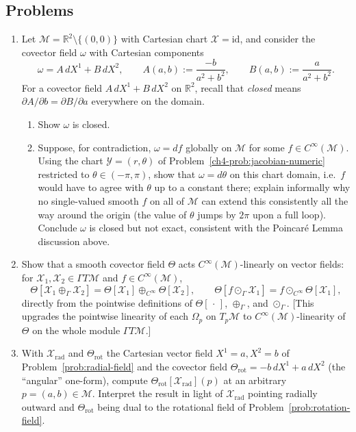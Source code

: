 \documentclass[11pt]{article}
\newcommand{\Cinf}{C^\infty(\mathcal M)}
\begin{document}
\subsection*{Problems}

\begin{enumerate}[label=\textbf{5.\arabic*}, leftmargin=2.2cm, start=4]

\item \label{prob:angle-form-closed-not-exact}
Let $\mathcal M=\mathbb R^2\setminus\{(0,0)\}$ with Cartesian chart
$\mathcal X=\mathrm{id}$, and consider the covector field $\omega$ with
Cartesian components
\[
\omega = A\,dX^1 + B\,dX^2,\qquad A(a,b):=\frac{-b}{a^2+b^2},\qquad B(a,b):=\frac{a}{a^2+b^2}.
\]
For a covector field $A\,dX^1+B\,dX^2$ on $\mathbb R^2$, recall that
\emph{closed} means $\partial A/\partial b = \partial B/\partial a$
everywhere on the domain.
\begin{enumerate}[label=(\alph*)]
  \item Show $\omega$ is closed.
  \item Suppose, for contradiction, $\omega=df$ globally on $\mathcal M$
  for some $f\in\Cinf$. Using the chart $\mathcal Y=(r,\theta)$ of
  Problem~\ref{ch4-prob:jacobian-numeric} restricted to $\theta\in(-\pi,\pi)$,
  show that $\omega=d\theta$ on this chart domain, i.e.\ $f$ would have to
  agree with $\theta$ up to a constant there; explain informally why no
  single-valued smooth $f$ on all of $\mathcal M$ can extend this
  consistently all the way around the origin (the value of $\theta$ jumps
  by $2\pi$ upon a full loop). Conclude $\omega$ is closed but not exact,
  consistent with the Poincar\'e Lemma discussion above.
\end{enumerate}

\item \label{prob:covector-field-linear}
Show that a smooth covector field $\Theta$ acts $\Cinf$-linearly on vector
fields: for $\mathcal X_1,\mathcal X_2\in\Gamma T\mathcal M$ and $f\in
\Cinf$,
\[
\Theta[\mathcal X_1\oplus_\Gamma \mathcal X_2]=\Theta[\mathcal X_1]\oplus_{C^\infty}\Theta[\mathcal X_2],\qquad \Theta[f\odot_\Gamma \mathcal X_1]=f\odot_{C^\infty}\Theta[\mathcal X_1],
\]
directly from the pointwise definitions of $\Theta[\,\cdot\,]$,
$\oplus_\Gamma$, and $\odot_\Gamma$. [This upgrades the pointwise linearity
of each $\Omega_p$ on $T_p\mathcal M$ to $\Cinf$-linearity of $\Theta$ on
the whole module $\Gamma T\mathcal M$.]

\item \label{prob:angular-radial-orthogonal}
With $\mathcal X_{\mathrm{rad}}$ and $\Theta_{\mathrm{rot}}$ the Cartesian
vector field $X^1=a,X^2=b$ of Problem~\ref{prob:radial-field} and the
covector field $\Theta_{\mathrm{rot}}=-b\,dX^1+a\,dX^2$ (the ``angular''
one-form), compute $\Theta_{\mathrm{rot}}[\mathcal X_{\mathrm{rad}}](p)$ at
an arbitrary $p=(a,b)\in\mathcal M$. Interpret the result in light of
$\mathcal X_{\mathrm{rad}}$ pointing radially outward and
$\Theta_{\mathrm{rot}}$ being dual to the rotational field of
Problem~\ref{prob:rotation-field}.

\end{enumerate}
\end{document}
